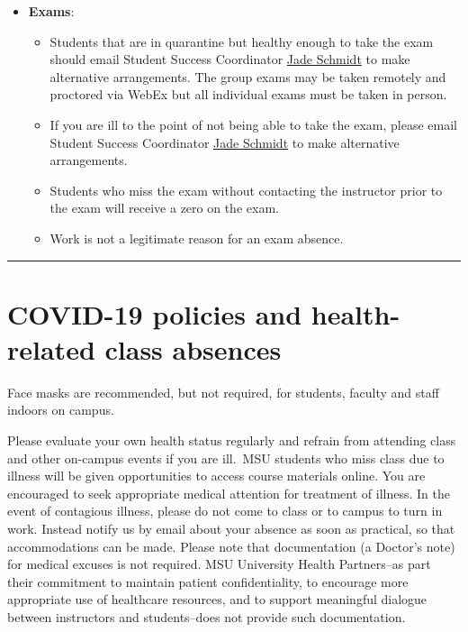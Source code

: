 \documentclass[
]{article}
\providecommand{\tightlist}{%
  \setlength{\itemsep}{0pt}\setlength{\parskip}{0pt}}
\begin{document}
\begin{itemize}
\tightlist
\item
  \textbf{Exams}:

  \begin{itemize}
  \tightlist
  \item
    Students that are in quarantine but healthy enough to take the exam
    should email Student Success Coordinator
    \href{mailto:\%20jade.schmidt2@montana.edu}{Jade Schmidt} to make
    alternative arrangements. The group exams may be taken remotely and
    proctored via WebEx but all individual exams must be taken in
    person.
  \item
    If you are ill to the point of not being able to take the exam,
    please email Student Success Coordinator
    \href{mailto:\%20jade.schmidt2@montana.edu}{Jade Schmidt} to make
    alternative arrangements.\\
  \item
    Students who miss the exam without contacting the instructor prior
    to the exam will receive a zero on the exam.
  \item
    Work is not a legitimate reason for an exam absence.
  \end{itemize}
\end{itemize}

\begin{center}\rule{0.5\linewidth}{0.5pt}\end{center}

\section{COVID-19 policies and health-related class
absences}\label{covid-19-policies-and-health-related-class-absences}

Face masks are recommended, but not required, for students, faculty and
staff indoors on campus.

Please evaluate your own health status regularly and refrain from
attending class and other on-campus events if you are ill.~MSU students
who miss class due to illness will be given opportunities to access
course materials online. You are encouraged to seek appropriate medical
attention for treatment of illness. In the event of contagious illness,
please do not come to class or to campus to turn in work. Instead notify
us by email about your absence as soon as practical, so that
accommodations can be made. Please note that documentation (a Doctor's
note) for medical excuses is not required. MSU University Health
Partners--as part their commitment to maintain patient confidentiality,
to encourage more appropriate use of healthcare resources, and to
support meaningful dialogue between instructors and students--does not
provide such documentation.
\end{document}
